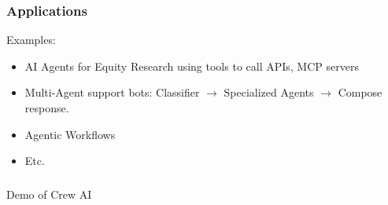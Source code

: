 		



\begin{frame}[fragile]\frametitle{Applications}

Examples:
    \begin{itemize}
        \item AI Agents for Equity Research using tools to call APIs, MCP servers
		\item Multi-Agent support bots: Classifier $\rightarrow$ Specialized Agents $\rightarrow$ Compose response.
		\item Agentic Workflows
		\item Etc.
    \end{itemize}
\end{frame}


\begin{frame}[fragile]\frametitle{}
\begin{center}
{\Large Demo of Crew AI}
\end{center}
\end{frame}


